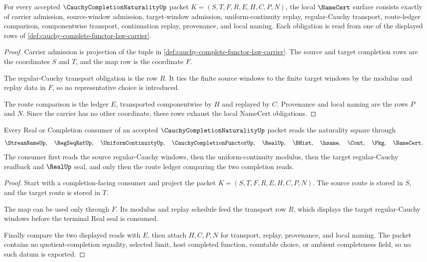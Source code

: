 \begin{theorem}
\label{thm:cauchy-completion-naturality-namecert-obligations}
For every accepted $\CauchyCompletionNaturalityUp$ packet $K=(S,T,F,R,E,H,C,P,N)$, the local $\NameCert$ surface consists exactly of carrier admission, source-window admission, target-window admission, uniform-continuity replay, regular-Cauchy transport, route-ledger comparison, componentwise transport, continuation replay, provenance, and local naming. Each obligation is read from one of the displayed rows of \autoref{def:cauchy-complete-functor-law-carrier}.
\end{theorem}
\begin{proof}
Carrier admission is projection of the tuple in \autoref{def:cauchy-complete-functor-law-carrier}. The source and target completion rows are the coordinates $S$ and $T$, and the map row is the coordinate $F$.

The regular-Cauchy transport obligation is the row $R$. It ties the finite source windows to the finite target windows by the modulus and replay data in $F$, so no representative choice is introduced.

The route comparison is the ledger $E$, transported componentwise by $H$ and replayed by $C$. Provenance and local naming are the rows $P$ and $N$. Since the carrier has no other coordinate, these rows exhaust the local NameCert obligations.
\end{proof}

\begin{theorem}
\label{thm:cauchy-completion-naturality-handoff}
Every Real or Completion consumer of an accepted $\CauchyCompletionNaturalityUp$ packet reads the naturality square through
$$
\StreamNameUp,\quad \RegSeqRatUp,\quad \UniformContinuityUp,\quad
\CauchyCompletionFunctorUp,\quad \RealUp,\quad \BHist,\quad
\hsame,\quad \Cont,\quad \Pkg,\quad \NameCert .
$$
The consumer first reads the source regular-Cauchy windows, then the uniform-continuity modulus, then the target regular-Cauchy readback and $\RealUp$ seal, and only then the route ledger comparing the two completion reads.
\end{theorem}
\begin{proof}
Start with a completion-facing consumer and project the packet $K=(S,T,F,R,E,H,C,P,N)$. The source route is stored in $S$, and the target route is stored in $T$.

The map can be used only through $F$. Its modulus and replay schedule feed the transport row $R$, which displays the target regular-Cauchy windows before the terminal Real seal is consumed.

Finally compare the two displayed reads with $E$, then attach $H,C,P,N$ for transport, replay, provenance, and local naming. The packet contains no quotient-completion equality, selected limit, host completed function, countable choice, or ambient completeness field, so no such datum is exported.
\end{proof}

